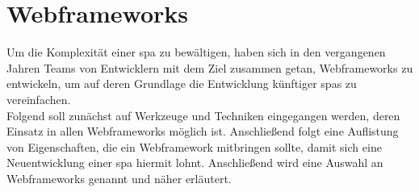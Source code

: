 \chapter{Webframeworks}
\label{sec:webframeworks}
Um die Komplexität einer \ac{spa} zu bewältigen, haben sich in den vergangenen Jahren Teams von Entwicklern mit dem Ziel zusammen getan, Webframeworks zu entwickeln, um auf deren Grundlage die Entwicklung künftiger \ac{spa}s zu vereinfachen. \\
Folgend soll zunächst auf Werkzeuge und Techniken eingegangen werden, deren Einsatz in allen Webframeworks möglich ist. Anschließend folgt eine Auflistung von Eigenschaften, die ein Webframework mitbringen sollte, damit sich eine Neuentwicklung einer \ac{spa} hiermit lohnt. Anschließend wird eine Auswahl an Webframeworks genannt und näher erläutert.





%